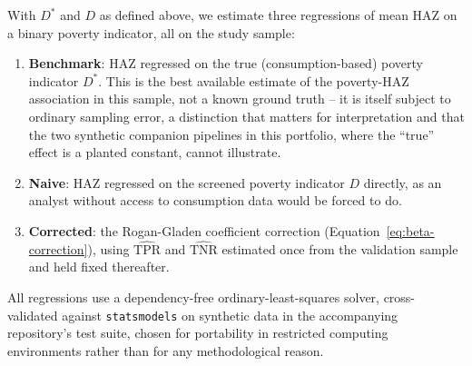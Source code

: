 \documentclass[12pt]{article}
\begin{document}
With $D^{*}$ and $D$ as defined above, we estimate three regressions of mean HAZ on a binary poverty indicator, all on the study sample:
\begin{enumerate}
\item \textbf{Benchmark}: HAZ regressed on the true (consumption-based) poverty indicator $D^{*}$. This is the best available estimate of the poverty-HAZ association in this sample, not a known ground truth -- it is itself subject to ordinary sampling error, a distinction that matters for interpretation and that the two synthetic companion pipelines in this portfolio, where the ``true'' effect is a planted constant, cannot illustrate.
\item \textbf{Naive}: HAZ regressed on the screened poverty indicator $D$ directly, as an analyst without access to consumption data would be forced to do.
\item \textbf{Corrected}: the Rogan-Gladen coefficient correction (Equation~\ref{eq:beta-correction}), using $\widehat{\text{TPR}}$ and $\widehat{\text{TNR}}$ estimated once from the validation sample and held fixed thereafter.
\end{enumerate}
All regressions use a dependency-free ordinary-least-squares solver, cross-validated against \texttt{statsmodels} on synthetic data in the accompanying repository's test suite, chosen for portability in restricted computing environments rather than for any methodological reason.
\end{document}
